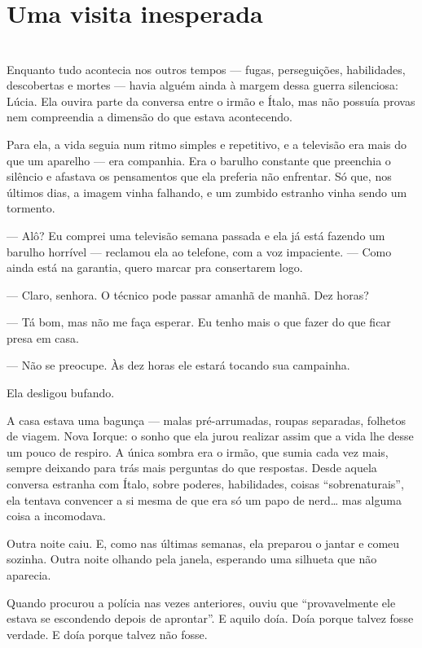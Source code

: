 \newpage

\ifdefined\useChapters
\chapter{Uma visita inesperada}
\else
\chapter{}
\fi

Enquanto tudo acontecia nos outros tempos — fugas, perseguições, habilidades, descobertas e mortes — havia alguém ainda à margem dessa guerra silenciosa: Lúcia. Ela ouvira parte da conversa entre o irmão e Ítalo, mas não possuía provas nem compreendia a dimensão do que estava acontecendo.

Para ela, a vida seguia num ritmo simples e repetitivo, e a televisão era mais do que um aparelho — era companhia. Era o barulho constante que preenchia o silêncio e afastava os pensamentos que ela preferia não enfrentar. Só que, nos últimos dias, a imagem vinha falhando, e um zumbido estranho vinha sendo um tormento.

— Alô? Eu comprei uma televisão semana passada e ela já está fazendo um barulho horrível — reclamou ela ao telefone, com a voz impaciente. — Como ainda está na garantia, quero marcar pra consertarem logo.

— Claro, senhora. O técnico pode passar amanhã de manhã. Dez horas?

— Tá bom, mas não me faça esperar. Eu tenho mais o que fazer do que ficar presa em casa.

— Não se preocupe. Às dez horas ele estará tocando sua campainha.

Ela desligou bufando.

A casa estava uma bagunça — malas pré-arrumadas, roupas separadas, folhetos de viagem. Nova Iorque: o sonho que ela jurou realizar assim que a vida lhe desse um pouco de respiro. A única sombra era o irmão, que sumia cada vez mais, sempre deixando para trás mais perguntas do que respostas. Desde aquela conversa estranha com Ítalo, sobre poderes, habilidades, coisas “sobrenaturais”, ela tentava convencer a si mesma de que era só um papo de nerd… mas alguma coisa a incomodava.

Outra noite caiu.  
E, como nas últimas semanas, ela preparou o jantar e comeu sozinha.  
Outra noite olhando pela janela, esperando uma silhueta que não aparecia.

Quando procurou a polícia nas vezes anteriores, ouviu que “provavelmente ele estava se escondendo depois de aprontar”. E aquilo doía. Doía porque talvez fosse verdade. E doía porque talvez não fosse.

